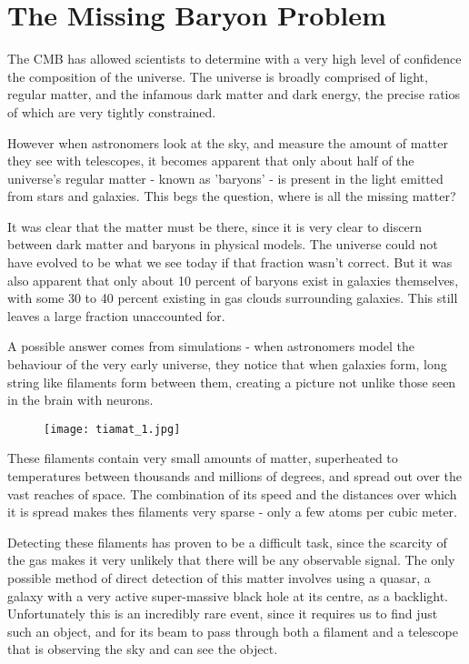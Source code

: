 \documentclass{nature}
\begin{document}
\section{The Missing Baryon Problem}
The CMB has allowed scientists to determine with a very high level of confidence the composition of the universe. The universe is broadly comprised of light, regular matter, and the infamous dark matter and dark energy, the precise ratios of which are very tightly constrained. 

However when astronomers look at the sky, and measure the amount of matter they see with telescopes, it becomes apparent that only about half of the universe's regular matter - known as 'baryons' - is present in the light emitted from stars and galaxies. This begs the question, where is all the missing matter? 

It was clear that the matter must be there, since it is very clear to discern between dark matter and baryons in physical models. The universe could not have evolved to be what we see today if that fraction wasn't correct. But it was also apparent that only about 10 percent of baryons exist in galaxies themselves, with some 30 to 40 percent existing in gas clouds surrounding galaxies. This still leaves a large fraction unaccounted for. 

A possible answer comes from simulations - when astronomers model the behaviour of the very early universe, they notice that when galaxies form, long string like filaments form between them, creating a picture not unlike those seen in the brain with neurons.

\begin{figure}[h]
    \texttt{[image: tiamat\_1.jpg]}
\end{figure}


These filaments contain very small amounts of matter, superheated to temperatures between thousands and millions of degrees, and spread out over the vast reaches of space. The combination of its speed and the distances over which it is spread makes thes filaments very sparse - only a few atoms per cubic meter. 

Detecting these filaments has proven to be a difficult task, since the scarcity of the gas makes it very unlikely that there will be any observable signal. The only possible method of direct detection of this matter involves using a quasar, a galaxy with a very active super-massive black hole at its centre, as a backlight. Unfortunately this is an incredibly rare event, since it requires us to find just such an object, and for its beam to pass through both a filament and a telescope that is observing the sky and can see the object. 
\end{document}
